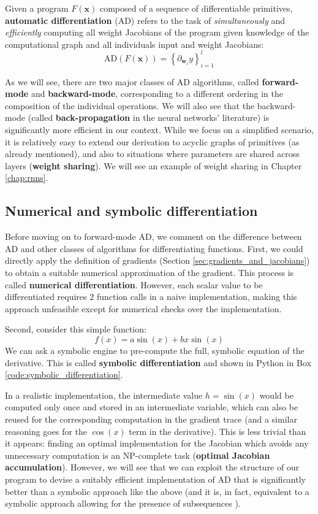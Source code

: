 \begin{definition} \addbottle
%
Given a program $F(\mathbf{x})$ composed of a sequence of differentiable primitives, \textbf{automatic differentiation} (AD) refers to the task of \textit{simultaneously} and \textit{efficiently} computing all weight Jacobians of the program given knowledge of the computational graph and all individuals input and weight Jacobians:
%
$$
\text{AD}(F(\mathbf{x}))=\left\{\partial_{\mathbf{w}_i} y\right\}_{i=1}^{l}
$$
\end{definition}
%
As we will see, there are two major classes of AD algorithms, called \textbf{forward-mode} and \textbf{backward-mode}, corresponding to a different ordering in the composition of the individual operations. We will also see that the backward-mode (called \textbf{back-propagation} in the neural networks’ literature) is significantly more efficient in our context. While we focus on a simplified scenario, it is relatively easy to extend our derivation to acyclic graphs of primitives (as already mentioned), and also to situations where parameters are shared across layers (\textbf{weight sharing}). We will see an example of weight sharing in Chapter \ref{chap:rnns}.

\subsection{Numerical and symbolic differentiation}

\addteacup Before moving on to forward-mode AD, we comment on the difference between AD and other classes of algorithms for differentiating functions. First, we could directly apply the definition of gradients (Section \ref{sec:gradients_and_jacobians}) to obtain a suitable numerical approximation of the gradient. This process is called \textbf{numerical differentiation}. However, each scalar value to be differentiated requires $2$ function calls in a naive implementation, making this approach unfeasible except for numerical checks over the implementation.

Second, consider this simple function:
%
$$
f(x)=a\sin(x)+bx\sin(x)
$$
%
We can ask a symbolic engine to pre-compute the full, symbolic equation of the derivative. This is called \textbf{symbolic differentiation} and shown in Python in Box \ref{code:symbolic_differentiation}.

In a realistic implementation, the intermediate value $h=\sin(x)$ would be computed only once and stored in an intermediate variable, which can also be reused for the corresponding computation in the gradient trace (and a similar reasoning goes for the $\cos(x)$ term in the derivative). This is less trivial than it appears: finding an optimal implementation for the Jacobian which avoids any unnecessary computation is an NP-complete task (\textbf{optimal Jacobian accumulation}). However, we will see that we can exploit the structure of our program to devise a suitably efficient implementation of AD that is significantly better than a symbolic approach like the above (and it is, in fact, equivalent to a symbolic approach allowing for the presence of subsequences \cite{laue2019equivalence}).

